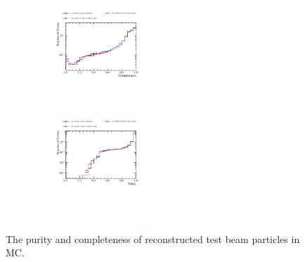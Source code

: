 \begin{figure}
\includegraphics[width=0.5\textwidth]{Figures/Metrics/MC/Beam/BeamParticleCompleteness.pdf}
\includegraphics[width=0.5\textwidth]{Figures/Metrics/MC/Beam/BeamParticlePurity.pdf}
\caption{The purity and completeness of reconstructed test beam particles in MC.}
\label{fig:tbrecopurcom}
\end{figure}

